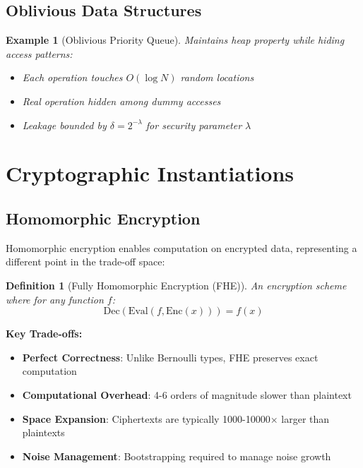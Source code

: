 \documentclass[11pt,final]{article}
\newtheorem{definition}[theorem]{Definition}
\newtheorem{example}[theorem]{Example}
\begin{document}
\subsection{Oblivious Data Structures}

\begin{example}[Oblivious Priority Queue]
Maintains heap property while hiding access patterns:
\begin{itemize}
    \item Each operation touches $O(\log N)$ random locations
    \item Real operation hidden among dummy accesses
    \item Leakage bounded by $\delta = 2^{-\lambda}$ for security parameter $\lambda$
\end{itemize}
\end{example}

\section{Cryptographic Instantiations}

\subsection{Homomorphic Encryption}

Homomorphic encryption enables computation on encrypted data, representing a different point in the trade-off space:

\begin{definition}[Fully Homomorphic Encryption (FHE)]
An encryption scheme where for any function $f$:
\begin{equation}
\text{Dec}(\text{Eval}(f, \text{Enc}(x))) = f(x)
\end{equation}
\end{definition}

\textbf{Key Trade-offs:}
\begin{itemize}
    \item \textbf{Perfect Correctness}: Unlike Bernoulli types, FHE preserves exact computation
    \item \textbf{Computational Overhead}: 4-6 orders of magnitude slower than plaintext
    \item \textbf{Space Expansion}: Ciphertexts are typically 1000-10000× larger than plaintexts
    \item \textbf{Noise Management}: Bootstrapping required to manage noise growth
\end{itemize}
\end{document}
